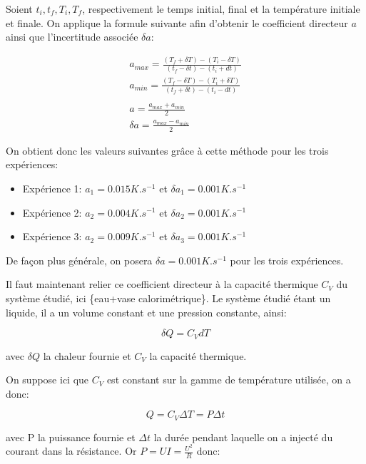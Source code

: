 \documentclass[12pt]{article}
\begin{document}
Soient $t_i, t_f, T_i, T_f$, respectivement le temps initial, final et la température initiale et finale. On applique la formule suivante afin d'obtenir le coefficient directeur $a$ ainsi que l'incertitude associée $\delta a$:

\begin{gather*}
	a_{max} = \frac{(T_f + \delta T) - (T_i - \delta T)}{(t_f - \delta t) - (t_i + dt)} \\
	a_{min} = \frac{(T_f - \delta T) - (T_i + \delta T)}{(t_f + \delta t) - (t_i - dt)} \\
	\\
	a = \frac{a_{max} + a_{min}}{2} \\
	\delta a = \frac{a_{max} - a_{min}}{2}
\end{gather*}

On obtient donc les valeurs suivantes grâce à cette méthode pour les trois expériences:
\begin{itemize}
	\item Expérience 1: $a_1 = 0.015 K.s^{-1}$ et $\delta a_1 = 0.001 K.s^{-1}$
	\item Expérience 2: $a_2 = 0.004 K.s^{-1}$ et $\delta a_2 = 0.001 K.s^{-1}$
	\item Expérience 3: $a_2 = 0.009 K.s^{-1}$ et $\delta a_3 = 0.001 K.s^{-1}$
\end{itemize}

De façon plus générale, on posera $\delta a = 0.001 K.s^{-1}$ pour les trois expériences.

\newpage
Il faut maintenant relier ce coefficient directeur à la capacité thermique $C_V$ du système étudié, ici \{eau+vase calorimétrique\}.
Le système étudié étant un liquide, il a un volume constant et une pression constante, ainsi:

\begin{equation}
\delta Q=C_VdT
\end{equation}

avec $\delta Q$ la chaleur fournie et $C_V$ la capacité thermique. 

On suppose ici que $C_V$ est constant sur la gamme de température utilisée, on a donc:

\begin{equation}
Q = C_V\Delta T = P\Delta t
\end{equation}

avec P la puissance fournie et $\Delta t$ la durée pendant laquelle on a injecté du courant dans la résistance. Or $P=UI=\frac{U^2}{R}$ donc:
\end{document}
